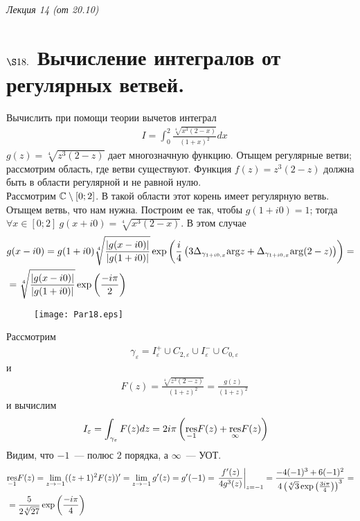 \begin{flushright}
    \textit{Лекция 14 (от 20.10)}
\end{flushright}
\section{$\S 18.$ Вычисление интегралов от регулярных ветвей.}
\Example
Вычислить при помощи теории вычетов интеграл
\begin{align*}
  & I = \int_0^2 \frac{\sqrt[4]{x^3(2-x)}}{(1+x)^2} dx
\end{align*}
\nonum
$g(z) = \sqrt[4]{z^3(2-z)}$ дает многозначную функцию. Отыщем регулярные ветви;
рассмотрим область, где ветви существуют. Функция $f(z) = z^3(2-z)$ должна быть
в области регулярной и не равной нулю.
\\
Рассмотрим $\mathbb{C} \setminus [0;2]$. В такой области этот корень имеет регулярную
ветвь.
\\
Отыщем ветвь, что нам нужна. Построим ее так, чтобы $g(1+i0) = 1$; тогда
$\forall x \in [0;2] \ g(x+i0) = \sqrt[4]{x^3(2-x)}$. В этом случае
\begin{align*}
  & g(x-i0) = g(1+i0)\sqrt[4]{\frac{\left| g(x-i0) \right|}{\left| g(1+i0) \right|}}\exp\left( \frac{i}{4}\left( 3\Delta_{\gamma_{1+i0,x}}\mathrm{arg} z + \Delta_{\gamma_{1+i0,x}}\mathrm{arg} (2-z) \right) \right) = \\
  & = \sqrt[4]{\frac{\left| g(x-i0) \right|}{\left| g(1+i0) \right|}}\exp\left( \frac{-i\pi}{2}\right)
\end{align*}
\begin{figure}[h!]
		\centering
		\texttt{[image: Par18.eps]}
		\label{fig:18.1}
\end{figure}
Рассмотрим
\begin{align*}
  & \gamma_\varepsilon = I_\varepsilon^+\cup C_{2, \varepsilon} \cup I_\varepsilon^-\cup C_{0, \varepsilon}
\end{align*}
и
\begin{align*}
  & F(z) = \frac{\sqrt[4]{z^3(2-z)}}{(1+z)^2} = \frac{g(z)}{(1+z)^2}
\end{align*}
и вычислим
\begin{align*}
  & I_\varepsilon = \int_{\gamma_\varepsilon}F(z) dz = 2 i \pi \left( \underset{-1}{\mathrm{res}} F(z) + \underset{\infty}{\mathrm{res}} F(z) \right)
\end{align*}
Видим, что $-1$~--- полюс $2$ порядка, а $\infty$~--- УОТ.
\begin{align*}
  & \underset{-1}{\mathrm{res}} F(z) = \lim_{z \to -1}((z+1)^2F(z))' = \lim_{z \to -1}g'(z) = g'(-1) = \left. \frac{f'(z)}{4g^3(z)}\right|_{z = -1} = \frac{-4(-1)^3+6(-1)^2}{4\left( \sqrt[4]{3}\exp\left( \frac{3i\pi}{4} \right)\right)^3} = \\
  & = \frac{5}{2\sqrt[4]{27}}\exp\left( \frac{-i\pi}{4} \right)
\end{align*}
